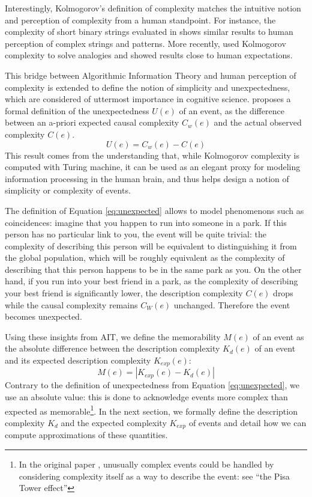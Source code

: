 \documentclass[conference]{IEEEtran}
\begin{document}
Interestingly, Kolmogorov's definition of complexity matches the intuitive
notion and perception of complexity from a human standpoint. For instance, the
complexity of short binary strings evaluated in \cite{delahaye_numerical_2012}
shows similar results to human perception of complex strings and patterns. More
recently, \cite{murena_solving_2020} used Kolmogorov complexity to solve
analogies and showed results close to human expectations.

This bridge between Algorithmic Information Theory and human perception of
complexity is extended to define the notion of simplicity and unexpectedness,
which are considered of uttermost importance in cognitive science\cite
{chater_simplicity_2003}.
\cite{dessalles2011coincidences} proposes a formal definition of the
 unexpectedness $U(e)$ of an event, as the difference between an a-priori
 expected causal complexity $C_{w}(e)$ and the actual observed complexity $C
 (e)$.
\begin{equation}
\label{eq:unexpected} U(e) = C_{w}(e) - C(e)
\end{equation}
This result comes from the understanding that, while Kolmogorov complexity is
computed with Turing machine, it can be used as an elegant proxy for modeling
information processing in the human brain, and thus helps design a notion of
simplicity or complexity of events.

The definition of Equation \ref{eq:unexpected} allows to model phenomenons
such as coincidences: imagine that you happen to run into someone in a park.
If this person has no particular link to you, the event will be quite
trivial: the complexity of describing this person will be equivalent to
distinguishing it from the global population, which will be roughly
equivalent as the complexity of describing that this person happens to be in
the same park as you. On the other hand, if you run into your best friend in
a park, as the complexity of describing your best friend is significantly
lower, the description complexity $C(e)$ drops while the causal complexity
remains $C_W (e)$ unchanged. Therefore the event becomes unexpected.

Using these insights from AIT, we define the memorability $M(e)$ of an event as the absolute difference between the description complexity $K_d(e)$ of an event and its expected description complexity $K_{exp}(e)$:
\begin{equation}
  \label{eq:memorability}
  M(e) = |K_{exp}(e) - K_d(e)|
\end{equation}
Contrary to the definition of unexpectedness from Equation \ref{eq:unexpected}, we use an absolute value: this is done to acknowledge events more complex than expected as memorable\footnote{In the original paper \cite{dessalles2011coincidences}, unusually complex events could be handled by considering complexity itself as a way to describe the event: see ``the Pisa Tower effect''\cite{dessalles_pisa_nodate}}. In the next section, we formally define the description complexity $K_d$ and the expected complexity $K_{exp}$ of events and detail how we can compute approximations of these quantities.
\end{document}
